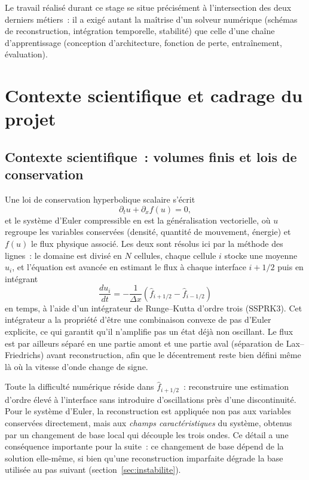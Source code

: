 \documentclass[12pt,a4paper,oneside]{report}
\begin{document}
Le travail réalisé durant ce stage se situe précisément à l'intersection des
deux derniers métiers~: il a exigé autant la maîtrise d'un solveur numérique
(schémas de reconstruction, intégration temporelle, stabilité) que celle d'une
chaîne d'apprentissage (conception d'architecture, fonction de perte,
entraînement, évaluation).

\chapter{Contexte scientifique et cadrage du projet}
\label{chap:contexte}

\section{Contexte scientifique~: volumes finis et lois de conservation}
\label{sec:fond-vf}

Une loi de conservation hyperbolique scalaire s'écrit
\[
\partial_t u + \partial_x f(u) = 0,
\]
et le système d'Euler compressible en est la généralisation vectorielle, où
$u$ regroupe les variables conservées (densité, quantité de mouvement, énergie)
et $f(u)$ le flux physique associé. Les deux sont résolus ici par la méthode
des lignes~: le domaine est divisé en $N$ cellules, chaque cellule $i$ stocke
une moyenne $u_i$, et l'équation est avancée en estimant le flux à chaque
interface $i+1/2$ puis en intégrant
\[
\frac{d u_i}{dt} = -\frac{1}{\Delta x}\left(\hat f_{i+1/2} - \hat f_{i-1/2}\right)
\]
en temps, à l'aide d'un intégrateur de Runge--Kutta d'ordre trois (SSPRK3).
Cet intégrateur a la propriété d'être une combinaison convexe de pas d'Euler
explicite, ce qui garantit qu'il n'amplifie pas un état déjà non oscillant. Le
flux est par ailleurs séparé en une partie amont et une partie aval
(séparation de Lax--Friedrichs) avant reconstruction, afin que le
décentrement reste bien défini même là où la vitesse d'onde change de signe.

Toute la difficulté numérique réside dans $\hat f_{i+1/2}$~: reconstruire une
estimation d'ordre élevé à l'interface sans introduire d'oscillations près
d'une discontinuité. Pour le système d'Euler, la reconstruction est appliquée
non pas aux variables conservées directement, mais aux \emph{champs
caractéristiques} du système, obtenus par un changement de base local qui
découple les trois ondes. Ce détail a une conséquence importante pour la
suite~: ce changement de base dépend de la solution elle-même, si bien qu'une
reconstruction imparfaite dégrade la base utilisée au pas suivant
(section~\ref{sec:instabilite}).
\end{document}
